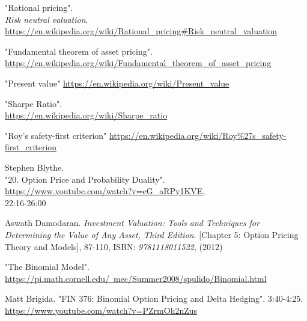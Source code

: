 \documentclass[12pt, letterpaper]{article}\usepackage{float}
\begin{document}
\begin{thebibliography}{9}
    "Rational pricing". \\
    \textit{Risk neutral valuation}. \\
    \href{https://en.wikipedia.org/wiki/Rational\_pricing\#Risk\_neutral\_valuation}{https://en.wikipedia.org/wiki/Rational\_pricing\#Risk\_neutral\_valuation}

    "Fundamental theorem of asset pricing". \\
    \href{https://en.wikipedia.org/wiki/Fundamental\_theorem\_of\_asset\_pricing}{https://en.wikipedia.org/wiki/Fundamental\_theorem\_of\_asset\_pricing}

    "Present value"
    \href{https://en.wikipedia.org/wiki/Present\_value}{https://en.wikipedia.org/wiki/Present\_value}

    "Sharpe Ratio". \\
    \href{https://en.wikipedia.org/wiki/Sharpe\_ratio}{https://en.wikipedia.org/wiki/Sharpe\_ratio}

    "Roy's safety-first criterion"
    \href{https://en.wikipedia.org/wiki/Roy\%27s\_safety-first\_criterion}{https://en.wikipedia.org/wiki/Roy\%27s\_safety-first\_criterion}

    Stephen Blythe. \\
    "20. Option Price and Probability Duality". \\
    \href{https://www.youtube.com/watch?v=eG\_aRPy1KVE}{https://www.youtube.com/watch?v=eG\_aRPy1KVE}, \\
    22:16-26:00
  
    Aswath Damodaran.
    \textit{Investment Valuation: Tools and Techniques for Determining the Value of Any Asset, Third Edition}.
    [Chapter 5: Option Pricing Theory and Models], 87-110,
    ISBN: \textit{9781118011522},
    (2012)

    "The Binomial Model".
    \href{https://pi.math.cornell.edu/~mec/Summer2008/spulido/Binomial.html}{https://pi.math.cornell.edu/~mec/Summer2008/spulido/Binomial.html}

    Matt Brigida.
    "FIN 376: Binomial Option Pricing and Delta Hedging".
    3:40-4:25. \\
    \href{https://www.youtube.com/watch?v=PZrmOh2nZus}{https://www.youtube.com/watch?v=PZrmOh2nZus}


\end{thebibliography}
\end{document}
